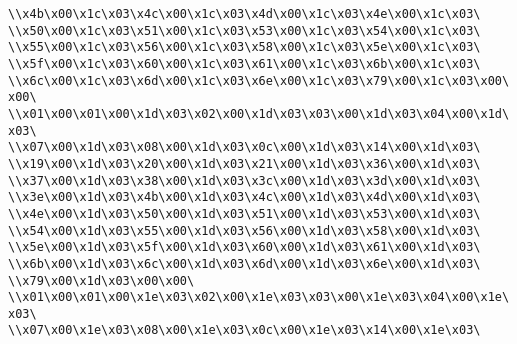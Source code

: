 \verb|\\x4b\x00\x1c\x03\x4c\x00\x1c\x03\x4d\x00\x1c\x03\x4e\x00\x1c\x03\|\newline
\verb|\\x50\x00\x1c\x03\x51\x00\x1c\x03\x53\x00\x1c\x03\x54\x00\x1c\x03\|\newline
\verb|\\x55\x00\x1c\x03\x56\x00\x1c\x03\x58\x00\x1c\x03\x5e\x00\x1c\x03\|\newline
\verb|\\x5f\x00\x1c\x03\x60\x00\x1c\x03\x61\x00\x1c\x03\x6b\x00\x1c\x03\|\newline
\verb|\\x6c\x00\x1c\x03\x6d\x00\x1c\x03\x6e\x00\x1c\x03\x79\x00\x1c\x03\x00\x00\|\newline
\verb|\\x01\x00\x01\x00\x1d\x03\x02\x00\x1d\x03\x03\x00\x1d\x03\x04\x00\x1d\x03\|\newline
\verb|\\x07\x00\x1d\x03\x08\x00\x1d\x03\x0c\x00\x1d\x03\x14\x00\x1d\x03\|\newline
\verb|\\x19\x00\x1d\x03\x20\x00\x1d\x03\x21\x00\x1d\x03\x36\x00\x1d\x03\|\newline
\verb|\\x37\x00\x1d\x03\x38\x00\x1d\x03\x3c\x00\x1d\x03\x3d\x00\x1d\x03\|\newline
\verb|\\x3e\x00\x1d\x03\x4b\x00\x1d\x03\x4c\x00\x1d\x03\x4d\x00\x1d\x03\|\newline
\verb|\\x4e\x00\x1d\x03\x50\x00\x1d\x03\x51\x00\x1d\x03\x53\x00\x1d\x03\|\newline
\verb|\\x54\x00\x1d\x03\x55\x00\x1d\x03\x56\x00\x1d\x03\x58\x00\x1d\x03\|\newline
\verb|\\x5e\x00\x1d\x03\x5f\x00\x1d\x03\x60\x00\x1d\x03\x61\x00\x1d\x03\|\newline
\verb|\\x6b\x00\x1d\x03\x6c\x00\x1d\x03\x6d\x00\x1d\x03\x6e\x00\x1d\x03\|\newline
\verb|\\x79\x00\x1d\x03\x00\x00\|\newline
\verb|\\x01\x00\x01\x00\x1e\x03\x02\x00\x1e\x03\x03\x00\x1e\x03\x04\x00\x1e\x03\|\newline
\verb|\\x07\x00\x1e\x03\x08\x00\x1e\x03\x0c\x00\x1e\x03\x14\x00\x1e\x03\|\newline
